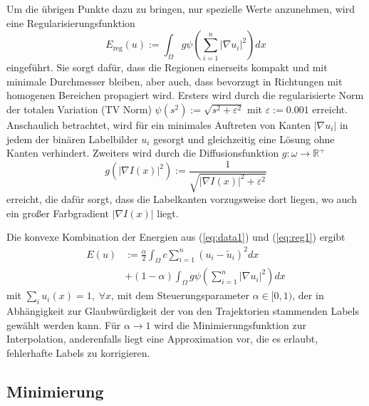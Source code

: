Um die übrigen Punkte dazu zu bringen, nur spezielle Werte anzunehmen, wird eine Regularisierungsfunktion
\begin{equation}
  E_{\mathrm{reg}}(u) := \int_\Omega g \psi \left( \sum \limits_{i=1}^n \left| \nabla u_i \right|^2 \right) dx
\label{eq:reg1}
\end{equation}
eingeführt. Sie sorgt dafür, dass die Regionen einerseits kompakt und mit minimale Durchmesser bleiben,
aber auch, dass bevorzugt in Richtungen mit homogenen Bereichen propagiert wird. Ersters wird durch die regularisierte Norm der totalen Variation (TV Norm)
$\psi(s^2):=\sqrt{s^2+\varepsilon^2}$ mit $\varepsilon := 0.001$ erreicht. Anschaulich betrachtet, wird für ein minimales Auftreten von Kanten
$|\nabla u_i|$ in jedem der binären Labelbilder $u_i$ gesorgt und gleichzeitig eine Lösung ohne Kanten verhindert.
Zweiters wird durch die Diffusionsfunktion $g: \omega \rightarrow \mathbb{R}^+$
\begin{equation}
  g(|\nabla I(x)|^2) := \frac{1}{ \sqrt{|\nabla I(x)|^2+\varepsilon^2} }
\end{equation}
erreicht, die dafür sorgt, dass die Labelkanten vorzugsweise dort liegen, wo auch ein großer Farbgradient $|\nabla I(x)|$ liegt.

Die konvexe Kombination der Energien aus (\ref{eq:data1}) und (\ref{eq:reg1}) ergibt
\begin{equation}
  \begin{split}
    E(u) &:= \frac{\alpha}{2} \int_\Omega c \sum \limits_{i=1}^n (u_i - \tilde u_i)^2 dx \\
    & + (1-\alpha) \int_\Omega g \psi \left( \sum \limits_{i=1}^n \left| \nabla u_i \right|^2 \right) dx
  \end{split}
\label{eq:eng1}
\end{equation}
mit $\sum_i u_i(x) = 1,\; \forall x$, mit dem Steuerungsparameter $\alpha \in [0,1) $, der in Abhängigkeit zur Glaubwürdigkeit der
von den Trajektorien stammenden Labels gewählt werden kann. Für $\alpha \rightarrow 1$ wird die Minimierungsfunktion zur Interpolation, anderenfalls liegt eine
Approximation vor, die es erlaubt, fehlerhafte Labels zu korrigieren.

\subsection{Minimierung}

